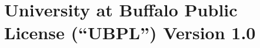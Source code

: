 \documentclass[letterpaper,colorlinks=true,linkcolor=blue]{book}
\makeatletter
\newcommand{\ct}[1]{{\ttfamily #1}} %
\newcommand{\cv}[1]{{\ttfamily{\itshape #1}}} %
\newcommand{\indexct}[1]{\index{#1@\ct{#1}}} %
\newcommand{\docfun}[2]{\vspace{3ex}\par\noindent\ct{(#1
#2)}\indexct{#1}\hfill [\textit{Function}]\newline}
\newcommand{\docmacro}[2]{\vspace{3ex}\par\noindent\ct{(#1
#2)}\indexct{#1}\hfill [\textit{Macro}]\newline}
\makeatother
\begin{document}


\backmatter
\appendix

\chapter{University at Buffalo Public License (``UBPL'') Version 1.0}
\renewcommand{\thesection}{\arabic{section}.}
\renewcommand{\thesubsection}{\arabic{section}.\arabic{subsection}.}
\setcounter{section}{0}
\end{document}
